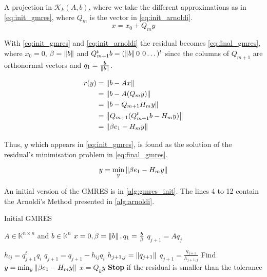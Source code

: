 
A projection in $\mathcal{K}_{k}(A,b)$, where we take the different approximations as in \ref{eq:init_gmres}, where $Q_{m}$ is the vector in \ref{eq:init_arnoldi}.
\begin{equation}\label{eq:init_gmres}
    x = x_{0} + Q_{m}y
\end{equation}

With \ref{eq:init_gmres} and \ref{eq:init_arnoldi} the residual becomes \ref{eq:final_gmres}, where $x_{0} = 0$, $\beta=\left\lVert b\right\rVert$ and $Q_{m+1}^{t}b=(\left\lVert b\right\rVert 0 \hspace{0.05in} 0\dots)^{t}$ since the columns of $Q_{m+1}$ are orthonormal vectors and $q_{1} = \frac{b}{\left\lVert b\right\rVert}$.

\begin{align} \label{eq:final_gmres}
    \begin{split}
        r(y) &= \left\lVert b - Ax\right\rVert\\
        &= \left\lVert b - A(Q_{m}y)\right\rVert\\
        &= \left\lVert b-Q_{m+1}H_{m}y\right\rVert \\
        &= \left\lVert Q_{m+1}(Q_{m+1}^{t}b-H_{m}y)\right\rVert \\
        &= \left\lVert\beta e_{1} - H_{m}y\right\rVert
    \end{split}
\end{align}


Thus, $y$ which appears in \ref{eq:init_gmres}, is found as the solution of the residual's minimisation problem  in \ref{eq:final_gmres}.

\begin{equation}\label{eq:y_gmres}
    y = \min_{y} \left\lVert\beta e_{1} - H_{m}y\right\rVert
\end{equation}

An initial version of the GMRES is in \ref{alg:gmres_init}. The lines 4 to 12 contain the Arnoldi's Method presented in \ref{alg:arnoldi}.

\begin{algorithm}
    \caption{Initial GMRES}\label{alg:gmres_init}
    \begin{algorithmic}[1]
        \State $A \in \mathbb{K}^{n \times n}$ and $b\in \mathbb{K}^{n}$
        \State $x=0, \beta=\left\lVert b\right\rVert,q_{1}=\frac{b}{\beta}$
        \State $q_{j+1} = Aq_{j}$

        \State $h_{ij}= q_{j+1}^{t}q_{i}$
        \State $q_{j+1} = q_{j+1} - h_{ij}q_{i}$
        \EndFor
        \State $h_{j+1,j}=\left\lVert q_{j+1}\right\rVert$
        \State $q_{j+1} = \frac{q_{j+1}}{h_{j+1,j}}$
        \EndFor
        \State Find $y = \min_{y} \left\lVert\beta e_{1} - H_{m}y\right\rVert$
        \State $x = Q_{k}y$
        \State \textbf{Stop} if the residual is smaller than the tolerance
        \EndFor
    \end{algorithmic}
\end{algorithm}

